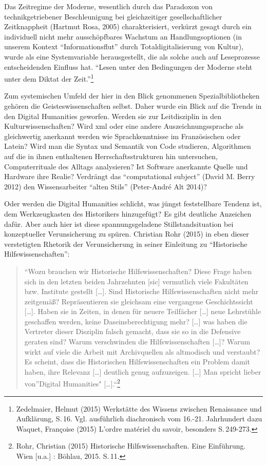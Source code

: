 \documentclass[a4paper,
fontsize=11pt,
oneside,
numbers=noperiodatend,
parskip=half-,
bibliography=totoc,
final
]{scrartcl}
\begin{document}
Das Zeitregime der Moderne, wesentlich durch das Paradoxon von
technikgetriebener Beschleunigung bei gleichzeitiger gesellschaftlicher
Zeitknappheit (Hartmut Rosa, 2005) charakterisiert, verkürzt gesagt
durch ein individuell nicht mehr ausschöpfbares Wachstum an
Handlungsoptionen (in unserem Kontext \enquote{Informationsflut} durch
Totaldigitalisierung von Kultur), wurde als eine Systemvariable
herausgestellt, die als solche auch auf Leseprozesse entscheidenden
Einfluss hat. \enquote{Lesen unter den Bedingungen der Moderne steht
unter dem Diktat der Zeit.}\footnote{Zedelmaier, Helmut (2015)
  Werkstätte des Wissens zwischen Renaissance und Aufklärung, S.\,16.
  Vgl. ausführlich diachronisch vom 16.-21. Jahrhundert dazu Waquet,
  Françoise (2015) L'ordre matériel du savoir, besonders S.\,249-273.}

Zum systemischen Umfeld der hier in den Blick genommenen
Spezialbibliotheken gehören die Geisteswissenschaften selbst. Daher
wurde ein Blick auf die Trends in den Digital Humanities geworfen.
Werden sie zur Leitdisziplin in den Kulturwissenschaften? Wird xml oder
eine andere Auszeichnungssprache als gleichwertig anerkannt werden wie
Sprachkenntnisse im Französischen oder Latein? Wird man die Syntax und
Semantik von Code studieren, Algorithmen auf die in ihnen enthaltenen
Herrschaftsstrukturen hin untersuchen, Computerrituale des Alltags
analysieren? Ist Software anerkannte Quelle und Hardware ihre Realie?
Verdrängt das \enquote{computational subject} (David M. Berry 2012) den
Wissensarbeiter \enquote{alten Stils} (Peter-André Alt 2014)?

Oder werden die Digital Humanities schlicht, was jüngst feststellbare
Tendenz ist, dem Werkzeugkasten des Historikers hinzugefügt? Es gibt
deutliche Anzeichen dafür. Aber auch hier ist diese spannungsgeladene
Stillstandsituation bei konzeptueller Verunsicherung zu spüren.
Christian Rohr (2015) in eben dieser verstetigten Rhetorik der
Verunsicherung in seiner Einleitung zu \enquote{Historische
Hilfswissenschaften}:

\begin{quote}
\enquote{Wozu brauchen wir Historische Hilfswissenschaften? Diese Frage
haben sich in den letzten beiden Jahrzehnten {[}sic{]} vermutlich viele
Fakultäten bzw. Institute gestellt {[}\ldots{}{]}. Sind Historische
Hilfswissenschaften nicht mehr zeitgemäß? Repräsentieren sie gleichsam
eine vergangene Geschichtssicht {[}\ldots{}{]}. Haben sie in Zeiten, in
denen für neuere Teilfächer {[}\ldots{}{]} neue Lehrstühle geschaffen
werden, keine Daseinsberechtigung mehr? {[}\ldots{}{]} was haben die
Vertreter dieser Disziplin falsch gemacht, dass sie so in die Defensive
geraten sind? Warum verschwinden die Hilfswissenschaften {[}\ldots{}{]}?
Warum wirkt auf viele die Arbeit mit Archivquellen als altmodisch und
verstaubt? Es scheint, dass die Historischen Hilfswissenschaften ein
Problem damit haben, ihre Relevanz {[}\ldots{}{]} deutlich genug
aufzuzeigen. {[}\ldots{}{]} Man spricht lieber von}Digital Humanities"
{[}\ldots{}{]}.``\footnote{Rohr, Christian (2015) Historische
  Hilfswissenschaften. Eine Einführung. Wien {[}u.a.{]} : Böhlau, 2015.
  S.\,11.}
\end{quote}
\end{document}
